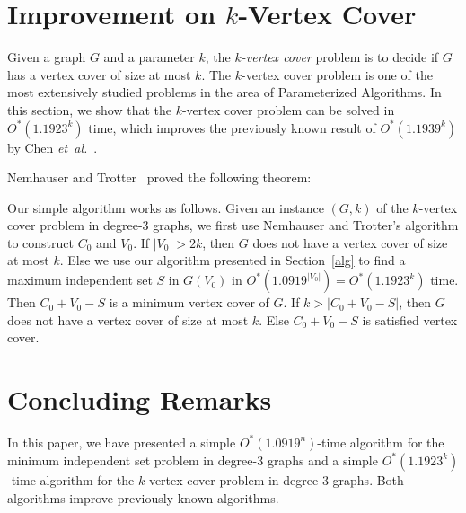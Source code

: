 \documentclass[runningheads]{llncs}
\begin{document}


\section{Improvement on $k$-Vertex Cover}
Given a graph $G$ and a parameter $k$, the \emph{$k$-vertex cover}
problem is to decide if $G$ has a vertex cover of size at most
$k$. The $k$-vertex cover problem is one of the most extensively
studied problems in the area of Parameterized Algorithms. In this
section, we show that the $k$-vertex cover problem can be solved
in $O^*(1.1923^k)$ time, which improves
 the previously known result of $O^*(1.1939^k)$ by Chen \emph{et~al.}~\cite{Chen:labeled3vc}.

Nemhauser and Trotter~\cite{Nemhauser:VCkernel} proved the
following theorem:


Our simple algorithm works as follows. Given an instance $(G,k)$
of the $k$-vertex cover problem in degree-$3$ graphs, we first use
Nemhauser and Trotter's algorithm to construct $C_0$ and $V_0$. If
$|V_0|>2k$, then $G$ does not have a vertex cover of size at most
$k$. Else we use our algorithm presented in Section~\ref{alg} to
find a maximum independent set $S$ in $G(V_0)$ in
$O^*(1.0919^{|V_0|})=O^*(1.1923^{k})$ time. Then $C_0+V_0-S$ is a
minimum vertex cover of $G$. If $k>|C_0+V_0-S|$, then $G$ does not
have a vertex cover of size at most $k$. Else $C_0+V_0-S$ is
satisfied vertex cover.










\section{Concluding Remarks}\label{conclusion}
In this paper, we have presented a simple $O^*(1.0919^n)$-time
algorithm for the minimum independent set problem in degree-$3$
graphs and a simple $O^*(1.1923^k)$-time algorithm for the
$k$-vertex cover problem in degree-$3$ graphs. Both algorithms
improve previously known algorithms.
\end{document}

